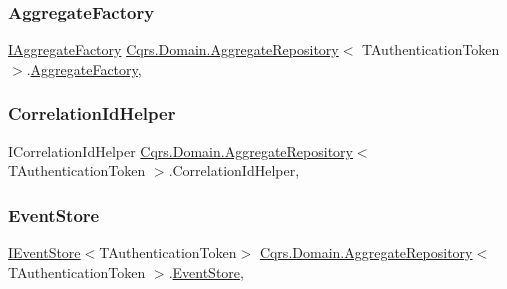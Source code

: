 \subsubsection{\texorpdfstring{Aggregate\+Factory}{AggregateFactory}}
{\footnotesize\ttfamily \hyperlink{interfaceCqrs_1_1Domain_1_1Factories_1_1IAggregateFactory}{I\+Aggregate\+Factory} \hyperlink{classCqrs_1_1Domain_1_1AggregateRepository}{Cqrs.\+Domain.\+Aggregate\+Repository}$<$ T\+Authentication\+Token $>$.\hyperlink{classCqrs_1_1Domain_1_1Factories_1_1AggregateFactory}{Aggregate\+Factory}\hspace{0.3cm}{\ttfamily [get]}, {\ttfamily [protected]}}

\mbox{\label{classCqrs_1_1Domain_1_1AggregateRepository_a758d2fd5c0cf30bc038a996800421fd0_a758d2fd5c0cf30bc038a996800421fd0}} 
\subsubsection{\texorpdfstring{Correlation\+Id\+Helper}{CorrelationIdHelper}}
{\footnotesize\ttfamily I\+Correlation\+Id\+Helper \hyperlink{classCqrs_1_1Domain_1_1AggregateRepository}{Cqrs.\+Domain.\+Aggregate\+Repository}$<$ T\+Authentication\+Token $>$.Correlation\+Id\+Helper\hspace{0.3cm}{\ttfamily [get]}, {\ttfamily [protected]}}

\mbox{\label{classCqrs_1_1Domain_1_1AggregateRepository_a99c8546ada9058c0488727b01c626528_a99c8546ada9058c0488727b01c626528}} 
\subsubsection{\texorpdfstring{Event\+Store}{EventStore}}
{\footnotesize\ttfamily \hyperlink{interfaceCqrs_1_1Events_1_1IEventStore}{I\+Event\+Store}$<$T\+Authentication\+Token$>$ \hyperlink{classCqrs_1_1Domain_1_1AggregateRepository}{Cqrs.\+Domain.\+Aggregate\+Repository}$<$ T\+Authentication\+Token $>$.\hyperlink{classCqrs_1_1Events_1_1EventStore}{Event\+Store}\hspace{0.3cm}{\ttfamily [get]}, {\ttfamily [protected]}}


